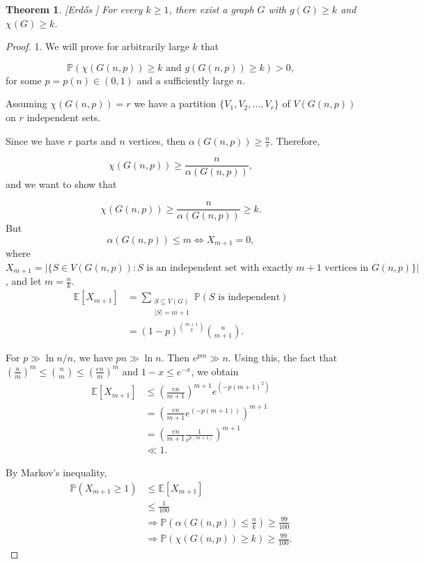 \documentclass[12pt,twoside,a4paper,bibliography=totocnumbered]{book}
\numberwithin{equation}{section}
\let\log=\ln
\newtheorem{theorem}             {Theorem}[section]
\theoremstyle{remark}
\begin{document}
\begin{theorem}\label{erdoss}\emph{[}{Erd\H{o}s \cite{Er59}}\emph{]} For every $k \geq 1$, there exist a graph $G$ with $g(G) \geq k$ and $\chi(G) \geq k$.
\end{theorem}

\begin{proof} 1.
We will prove for arbitrarily large $k$ that

$$\mathbb{P}(\chi(G(n,p)) \geq k \text{ and } g(G(n,p)) \geq k) > 0 ,$$
for some $p =p(n) \in (0,1)$ and a sufficiently large $n$.

Assuming $\chi(G(n,p)) = r$ we have a partition $\{V_1,V_2,\ldots,V_r\}$ of $V(G(n,p))$ on $r$ independent sets.

Since we have $r$ parts and $n$ vertices, then $\alpha (G(n,p)) \geq \frac{n}{r}$. Therefore,

$$\chi(G(n,p)) \geq \frac{n}{\alpha(G(n,p))},$$
and we want to show that

$$\chi(G(n,p)) \geq \frac{n}{\alpha(G(n,p))} \geq k.$$
But
$$\alpha(G(n,p)) \leq m \iff X_{m+1}=0 ,$$
where 
$X_{m+1} = \big|\{S\in V(G(n,p))\colon \text{$S$ is an independent set with exactly $m+1$ vertices in $G(n,p)$}\}\big|$,
and let $m = \frac{n}{k}$. 
\begin{align*}
\mathbb{E}[X_{m+1}]&=\sum_{\substack{S \subseteq V(G) \\ |S| = m+1}} \mathbb{P}(S\text{ is independent})\\
&=(1-p)^{\binom{m+1}{2}} \binom{n}{m+1}.
\end{align*}

For $p \gg \log n/n$, we have $pn \gg \log n$. Then $e^{pm} \gg n$. Using this, the fact that $\left(\frac{n}{m}\right)^m \leq \binom{n}{m} \leq \left(\frac{en}{m}\right)^m$ and $1-x \leq e^{-x}$, we obtain
\begin{align*}
\mathbb{E}[X_{m+1}] &\leq \left(\frac{en}{m+1}\right)^{m+1}  e^{(-p(m+1)^2)} \\
&= \left(\frac{en}{m+1} e^{(-p(m+1))}\right)^{m+1}\\
&= \left(\frac{en}{m+1}\frac{1}{e^{p(m+1)}}\right)^{m+1}  \\
&\ll 1.
\end{align*}

By Markov's inequality,
 \begin{align*}
\mathbb{P}(X_{m+1} \geq 1) &\leq \mathbb{E}[X_{m+1}] \\
&\leq \frac{1}{100}  \\
&\Rightarrow \mathbb{P}\left(\alpha (G(n,p)) \leq \frac{n}{k}\right) \geq \frac{99}{100}\\ 
&\Rightarrow  \mathbb{P}\left(\chi(G(n,p)) \geq k \right) \geq \frac{99}{100}.
\end{align*}


\end{proof}
\end{document}
